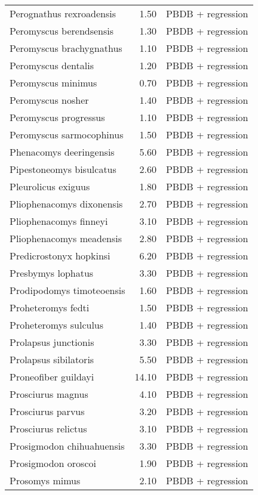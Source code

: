 \begin{table}[ht]
\begin{tabular}{lrl}
  Perognathus rexroadensis & 1.50 & PBDB + regression \\ 
  Peromyscus berendsensis & 1.30 & PBDB + regression \\ 
  Peromyscus brachygnathus & 1.10 & PBDB + regression \\ 
  Peromyscus dentalis & 1.20 & PBDB + regression \\ 
  Peromyscus minimus & 0.70 & PBDB + regression \\ 
  Peromyscus nosher & 1.40 & PBDB + regression \\ 
  Peromyscus progressus & 1.10 & PBDB + regression \\ 
  Peromyscus sarmocophinus & 1.50 & PBDB + regression \\ 
  Phenacomys deeringensis & 5.60 & PBDB + regression \\ 
  Pipestoneomys bisulcatus & 2.60 & PBDB + regression \\ 
  Pleurolicus exiguus & 1.80 & PBDB + regression \\ 
  Pliophenacomys dixonensis & 2.70 & PBDB + regression \\ 
  Pliophenacomys finneyi & 3.10 & PBDB + regression \\ 
  Pliophenacomys meadensis & 2.80 & PBDB + regression \\ 
  Predicrostonyx hopkinsi & 6.20 & PBDB + regression \\ 
  Presbymys lophatus & 3.30 & PBDB + regression \\ 
  Prodipodomys timoteoensis & 1.60 & PBDB + regression \\ 
  Proheteromys fedti & 1.50 & PBDB + regression \\ 
  Proheteromys sulculus & 1.40 & PBDB + regression \\ 
  Prolapsus junctionis & 3.30 & PBDB + regression \\ 
  Prolapsus sibilatoris & 5.50 & PBDB + regression \\ 
  Proneofiber guildayi & 14.10 & PBDB + regression \\ 
  Prosciurus magnus & 4.10 & PBDB + regression \\ 
  Prosciurus parvus & 3.20 & PBDB + regression \\ 
  Prosciurus relictus & 3.10 & PBDB + regression \\ 
  Prosigmodon chihuahuensis & 3.30 & PBDB + regression \\ 
  Prosigmodon oroscoi & 1.90 & PBDB + regression \\ 
  Prosomys mimus & 2.10 & PBDB + regression \\ 

\end{tabular}
\end{table}
